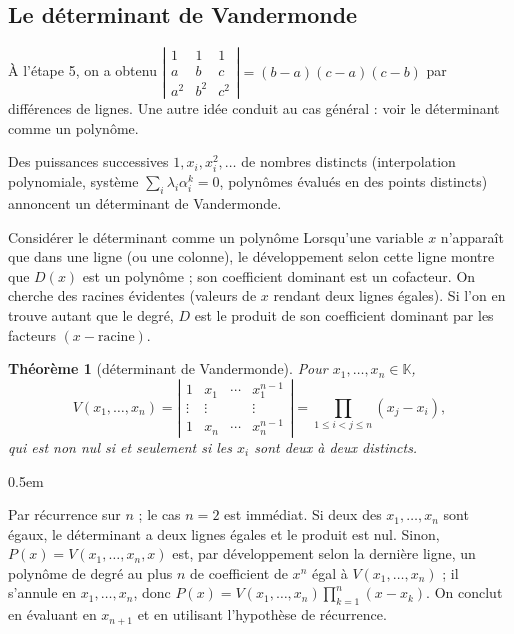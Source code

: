 \documentclass[a4paper,11pt]{article}
\makeatletter
\numberwithin{equation}{section}
\numberwithin{figure}{section}
\numberwithin{table}{section}
\theoremstyle{enonce}
\newtheorem{theoreme}[definition]{Théorème}
\theoremstyle{exemple}
\theoremstyle{remarque}
\renewcommand{\proofname}{Démonstration}
\renewenvironment{proof}[1][\proofname]{\par\pushQED{\qed}\normalfont
  \topsep0.5em\relax\trivlist\item[\hskip\labelsep\sffamily\itshape\color{Gris}#1.]\ignorespaces}
  {\popQED\endtrivlist\@endpefalse}
\newcommand{\K}{\mathbb{K}}
\newcommand{\dt}[1]{\left|\begin{matrix}#1\end{matrix}\right|}
\makeatother
\begin{document}
\subsection{Le déterminant de Vandermonde}

À l'étape 5, on a obtenu $\dt{1&1&1\\a&b&c\\a^2&b^2&c^2}=(b-a)(c-a)(c-b)$ par différences de lignes. Une autre idée
conduit au cas général : voir le déterminant comme un polynôme.

\begin{reflexe}
Des puissances successives $1,x_i,x_i^2,\dots$ de nombres distincts (interpolation polynomiale, système
$\sum_i\lambda_i\alpha_i^k=0$, polynômes évalués en des points distincts) annoncent un déterminant de Vandermonde.
\end{reflexe}

\begin{methode}{Considérer le déterminant comme un polynôme}\label{meth:poly}
Lorsqu'une variable $x$ n'apparaît que dans une ligne (ou une colonne), le développement selon cette ligne montre que
$D(x)$ est un polynôme ; son coefficient dominant est un cofacteur. On cherche des racines évidentes (valeurs de $x$
rendant deux lignes égales). Si l'on en trouve autant que le degré, $D$ est le produit de son coefficient dominant par
les facteurs $(x-\text{racine})$.
\end{methode}

\begin{theoreme}[déterminant de Vandermonde]\label{thm:vdm}
Pour $x_1,\dots,x_n\in\K$,
\[V(x_1,\dots,x_n)=\dt{1&x_1&\cdots&x_1^{n-1}\\\vdots&\vdots&&\vdots\\1&x_n&\cdots&x_n^{n-1}}=\prod_{1\leq i<j\leq n}(x_j-x_i),\]
qui est non nul si et seulement si les $x_i$ sont deux à deux distincts.
\end{theoreme}

\begin{proof}
Par récurrence sur $n$ ; le cas $n=2$ est immédiat. Si deux des $x_1,\dots,x_n$ sont égaux, le déterminant a deux
lignes égales et le produit est nul. Sinon, $P(x)=V(x_1,\dots,x_n,x)$ est, par développement selon la dernière ligne,
un polynôme de degré au plus $n$ de coefficient de $x^n$ égal à $V(x_1,\dots,x_n)$ ; il s'annule en $x_1,\dots,x_n$,
donc $P(x)=V(x_1,\dots,x_n)\prod_{k=1}^n(x-x_k)$. On conclut en évaluant en $x_{n+1}$ et en utilisant l'hypothèse de
récurrence.
\end{proof}
\end{document}
